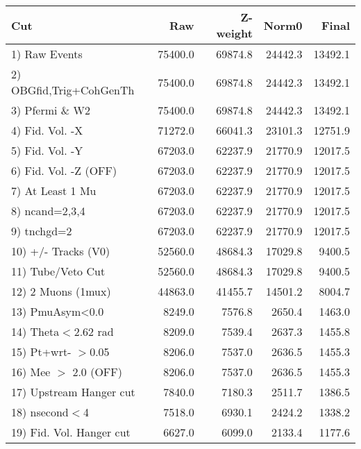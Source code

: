  \begin{table}[h!]\centering
 \begin{tabular}{||l||r|r|r|r||}
 \hline
 \hline
 Cut & Raw & Z-weight & Norm0 & Final \\
 \hline
  1) Raw Events           &     75400.0 &     69874.8 &     24442.3 &     13492.1 \\
  2) OBGfid,Trig+CohGenTh &     75400.0 &     69874.8 &     24442.3 &     13492.1 \\
  3) Pfermi \& W2         &     75400.0 &     69874.8 &     24442.3 &     13492.1 \\
  4) Fid. Vol. -X         &     71272.0 &     66041.3 &     23101.3 &     12751.9 \\
  5) Fid. Vol. -Y         &     67203.0 &     62237.9 &     21770.9 &     12017.5 \\
  6) Fid. Vol. -Z (OFF)   &     67203.0 &     62237.9 &     21770.9 &     12017.5 \\
  7) At Least 1 Mu        &     67203.0 &     62237.9 &     21770.9 &     12017.5 \\
  8) ncand=2,3,4          &     67203.0 &     62237.9 &     21770.9 &     12017.5 \\
  9) tnchgd=2             &     67203.0 &     62237.9 &     21770.9 &     12017.5 \\
 10) +/- Tracks (V0)      &     52560.0 &     48684.3 &     17029.8 &      9400.5 \\
 11) Tube/Veto Cut        &     52560.0 &     48684.3 &     17029.8 &      9400.5 \\
 12) 2 Muons (1mux)       &     44863.0 &     41455.7 &     14501.2 &      8004.7 \\
 13) PmuAsym<0.0          &      8249.0 &      7576.8 &      2650.4 &      1463.0 \\
 14) Theta$<$2.62 rad     &      8209.0 &      7539.4 &      2637.3 &      1455.8 \\
 15) Pt+wrt- $>$0.05      &      8206.0 &      7537.0 &      2636.5 &      1455.3 \\
 16) Mee $>$ 2.0  (OFF)   &      8206.0 &      7537.0 &      2636.5 &      1455.3 \\
 17) Upstream Hanger cut  &      7840.0 &      7180.3 &      2511.7 &      1386.5 \\
 18) nsecond$<$4          &      7518.0 &      6930.1 &      2424.2 &      1338.2 \\
 19) Fid. Vol. Hanger cut &      6627.0 &      6099.0 &      2133.4 &      1177.6 \\

\end{tabular}
\end{table}
